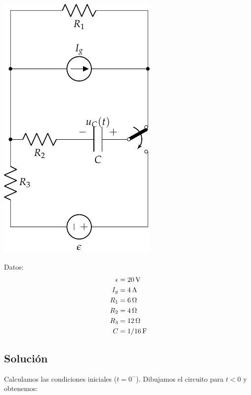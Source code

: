 \vspace{3mm}
\begin{minipage}{0.5\textwidth}
  \includegraphics[scale=0.85]{figuras/FM_4_3}
\end{minipage}
\hfill
\begin{minipage}{0.5\textwidth}
  Datos:
  \begin{align*}
    \epsilon &= \SI{20}{\volt}\\
    I_g &= \SI{4}{\ampere}\\
    R_1 &= \SI{6}{\ohm}\\
    R_2 &= \SI{4}{\ohm}\\
    R_3 &= \SI{12}{\ohm}\\
    C &= \SI[parse-numbers=false]{1/16}{\farad}      
  \end{align*}

\end{minipage}

\subsection*{Solución}

Calculamos las condiciones iniciales ($t = 0^-$). Dibujamos el circuito para $t < 0$ y obtenemos:

